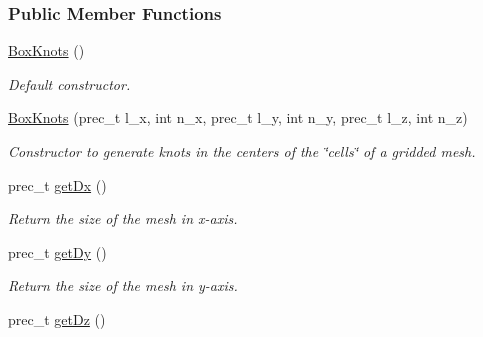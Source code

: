 \subsubsection*{Public Member Functions}
\begin{CompactItemize}
\item 
\hypertarget{classBoxKnots_709ea4fd3636e9e880661d03d1acccb5}{
\hyperlink{classBoxKnots_709ea4fd3636e9e880661d03d1acccb5}{BoxKnots} ()}
\label{classBoxKnots_709ea4fd3636e9e880661d03d1acccb5}

\begin{CompactList}\small\item\em Default constructor. \item\end{CompactList}\item 
\hyperlink{classBoxKnots_68a97e9465882cc4ad631a8437d10d17}{BoxKnots} (prec\_\-t l\_\-x, int n\_\-x, prec\_\-t l\_\-y, int n\_\-y, prec\_\-t l\_\-z, int n\_\-z)
\begin{CompactList}\small\item\em Constructor to generate knots in the centers of the \char`\"{}cells\char`\"{} of a gridded mesh. \item\end{CompactList}\item 
\hypertarget{classBoxKnots_d852d07c73af1a8c253db5c46df21a6d}{
prec\_\-t \hyperlink{classBoxKnots_d852d07c73af1a8c253db5c46df21a6d}{getDx} ()}
\label{classBoxKnots_d852d07c73af1a8c253db5c46df21a6d}

\begin{CompactList}\small\item\em Return the size of the mesh in x-axis. \item\end{CompactList}\item 
\hypertarget{classBoxKnots_1c3e6375203ff136ce8bc8f7ba5fb94d}{
prec\_\-t \hyperlink{classBoxKnots_1c3e6375203ff136ce8bc8f7ba5fb94d}{getDy} ()}
\label{classBoxKnots_1c3e6375203ff136ce8bc8f7ba5fb94d}

\begin{CompactList}\small\item\em Return the size of the mesh in y-axis. \item\end{CompactList}\item 
\hypertarget{classBoxKnots_ac9bd8de7f58e4336d3883688e1f7876}{
prec\_\-t \hyperlink{classBoxKnots_ac9bd8de7f58e4336d3883688e1f7876}{getDz} ()}
\label{classBoxKnots_ac9bd8de7f58e4336d3883688e1f7876}


\end{CompactItemize}
